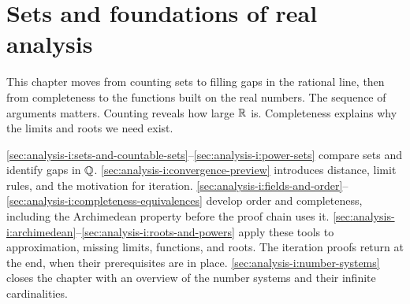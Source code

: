 \chapter{Sets and foundations of real analysis}
\label{ch:analysis-i:sets-and-foundations}




This chapter moves from counting sets to filling gaps in the
rational line, then from completeness to the functions built on the real
numbers. The sequence of arguments matters. Counting reveals how large
$\mathbb{R}$ is. Completeness explains why the limits and roots we need exist.

\autoref{sec:analysis-i:sets-and-countable-sets}--\autoref{sec:analysis-i:power-sets}
compare sets and identify gaps in $\mathbb{Q}$.
\autoref{sec:analysis-i:convergence-preview} introduces distance, limit
rules, and the motivation for iteration.
\autoref{sec:analysis-i:fields-and-order}--\autoref{sec:analysis-i:completeness-equivalences}
develop order and completeness, including the Archimedean property before
the proof chain uses it.
\autoref{sec:analysis-i:archimedean}--\autoref{sec:analysis-i:roots-and-powers}
apply these tools to approximation, missing limits, functions, and roots.
The iteration proofs return at the end, when their prerequisites are in place.
\autoref{sec:analysis-i:number-systems} closes the chapter
with an overview of the number systems and their infinite cardinalities.













